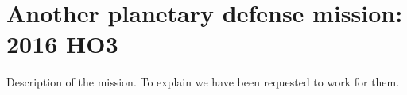 \section{Another planetary defense mission: 2016 HO3}
\label{HO3}

Description of the mission. To explain we have been requested to work for them.

